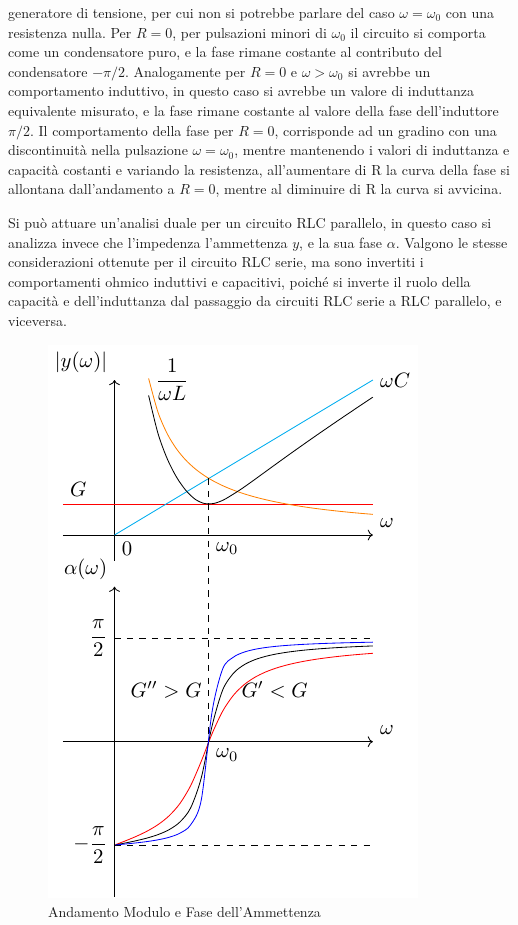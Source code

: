\documentclass{article}
\numberwithin{equation}{subsection}
\begin{document}
generatore di tensione, per cui non si potrebbe parlare del caso $\omega=\omega_0$ con una resistenza nulla. Per $R=0$, per pulsazioni minori di $\omega_0$ il circuito 
si comporta come un condensatore puro, e la fase rimane costante al contributo del condensatore $-\pi/2$. Analogamente per $R=0$ e $\omega>\omega_0$ si avrebbe un 
comportamento induttivo, in questo caso si avrebbe un valore di induttanza equivalente misurato, e la fase rimane costante al valore della fase dell'induttore $\pi/2$. 
Il comportamento della fase per $R=0$, corrisponde ad un gradino con una discontinuità nella pulsazione $\omega=\omega_0$, mentre mantenendo i valori di induttanza e capacità 
costanti e variando la resistenza, all'aumentare di R la curva della fase si allontana dall'andamento a $R=0$, mentre al diminuire di R la curva si avvicina. 



Si può attuare un'analisi duale per un circuito RLC parallelo, in questo caso si analizza invece che l'impedenza l'ammettenza $y$, e la sua fase $\alpha$. Valgono le stesse 
considerazioni ottenute per il circuito RLC serie, ma sono invertiti i comportamenti ohmico induttivi e capacitivi, poiché si inverte il ruolo della capacità e dell'induttanza 
dal passaggio da circuiti RLC serie a RLC parallelo, e viceversa. 

\begin{figure}[H]%
    \centering
    \includegraphics{andamento-ammettenza-rlc-parallelo.pdf}%
    \caption{Andamento Modulo e Fase dell'Ammettenza}%
    \label{fig:andamento-ammettenza-rlc-parallelo}
\end{figure}
\end{document}
